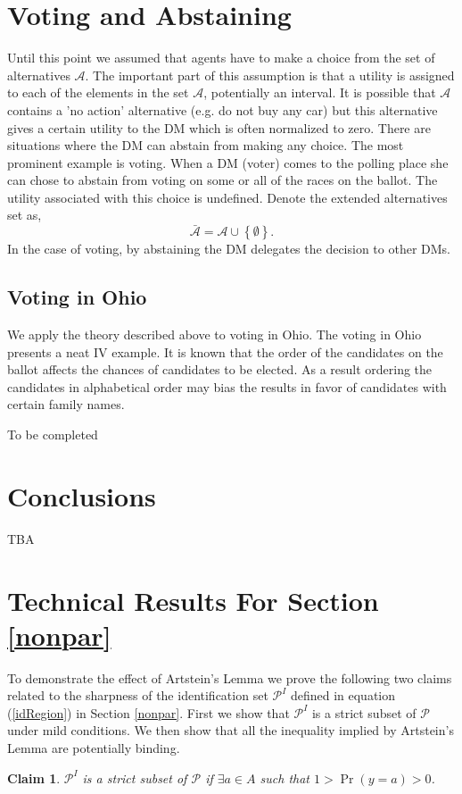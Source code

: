\documentclass[reqno]{article}
\newtheorem{claim}{Claim}[section]
\begin{document}
\section{Voting and Abstaining}\label{Voting}

Until this point we assumed that agents have to make a choice from the set
of alternatives $\mathcal{A}$. The important part of this assumption is that
a utility is assigned to each of the elements in the set $\mathcal{A}$,
potentially an interval. It is possible that $\mathcal{A}$ contains a 'no
action' alternative (e.g. do not buy any car) but this alternative gives a
certain utility to the DM which is often normalized to zero. There are
situations where the DM can abstain from making any choice. The most
prominent example is voting. When a DM (voter) comes to the polling place
she can chose to abstain from voting on some or all of the races on the
ballot. The utility associated with this choice is undefined. Denote the
extended alternatives set as,%
\begin{equation*}
\mathcal{\bar{A}}=\mathcal{A}\cup \left\{ \emptyset \right\} .
\end{equation*}%
In the case of voting, by abstaining the DM delegates the decision to other
DMs.

\subsection{Voting in Ohio}

We apply the theory described above to voting in Ohio. The voting in Ohio
presents a neat IV example. It is known that the order of the candidates on
the ballot affects the chances of candidates to be elected. As a result ordering the candidates in alphabetical order may bias the
results in favor of candidates with certain family names.

To be completed

\section{Conclusions}\label{conclustions}
TBA

\newpage 
\appendix
\appendixpage
\section{Technical Results For Section \ref{nonpar} }\label{nonparAppendix}
To demonstrate the effect of Artstein's Lemma we prove the following two claims related to the sharpness of the identification set $\mathcal{P}^I$ defined in equation (\ref{idRegion}) in Section \ref{nonpar}. First we show that $\mathcal{P}^I$ is a strict subset of $\mathcal{P}$ under mild conditions. We then show that all the inequality implied by Artstein's Lemma are potentially binding. 
\begin{claim}
$\mathcal{P}^{I}$ is a strict subset of $\mathcal{P}$ if $\exists a \in A$ such that $1 >\Pr (y=a) >0$.
\end{claim}
\end{document}
